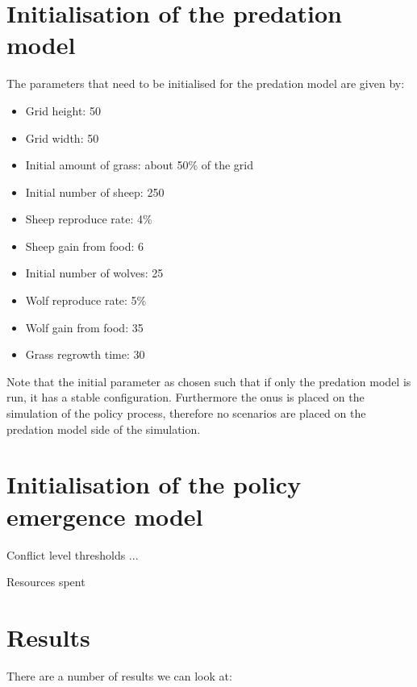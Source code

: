 \documentclass[12pt]{article}
\begin{document}
\section{Initialisation of the predation model}
\label{sec:predation_initialisation}

The parameters that need to be initialised for the predation model are given by:

\begin{itemize}
\item Grid height: 50
\item Grid width: 50
\item Initial amount of grass: about 50\% of the grid
\item Initial number of sheep: 250
\item Sheep reproduce rate: 4\%
\item Sheep gain from food: 6
\item Initial number of wolves: 25
\item Wolf reproduce rate: 5\%
\item Wolf gain from food: 35
\item Grass regrowth time: 30
\end{itemize}

Note that the initial parameter as chosen such that if only the predation model is run, it has a stable configuration. Furthermore the onus is placed on the simulation of the policy process, therefore no scenarios are placed on the predation model side of the simulation.


\section{Initialisation of the policy emergence model}
\label{sec:}

Conflict level thresholds ...

Resources spent


\section{Results}
\label{sec:}

There are a number of results we can look at:
\end{document}
